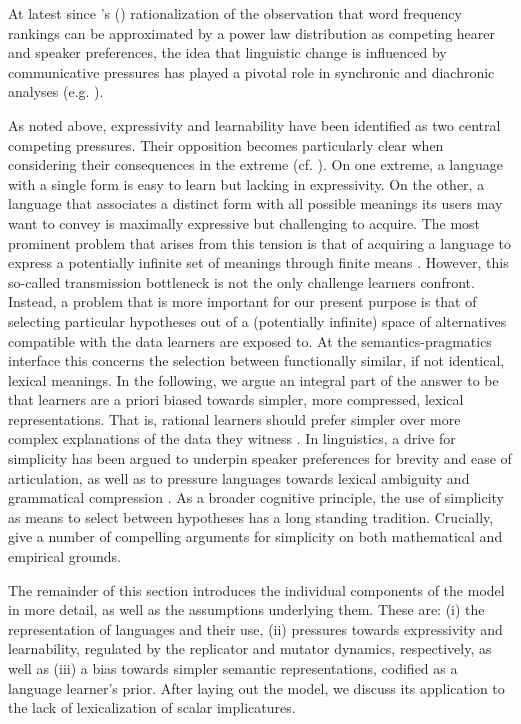 \documentclass[a4paper]{article}
\newcommand{\citeposs}[2][]{\citeauthor{#2}'s (\citeyear[#1]{#2})}
\newcommand{\hl}[1]{\textcolor[rgb]{.8,.33,.0}{#1}}%
\begin{document}
At latest since \citeposs{zipf:1949} rationalization of the observation that word frequency rankings can be approximated by a power law distribution as competing hearer and speaker preferences, the idea that linguistic change is influenced by communicative pressures has played a pivotal role in synchronic and diachronic analyses (e.g. \citealt{martinet:1962, horn:1984,jaeger+vRooij:2007,jaeger:2007, piantadosi:2014,kirby+etal:2015}). 

As noted above, expressivity and learnability have been identified as two central competing pressures. Their opposition becomes particularly clear when considering their consequences in the extreme (cf. \citealt{kemp+regier:2012,kirby+etal:2015}). On one extreme, a language with a single form is easy to learn but lacking in expressivity. On the other, a language that associates a distinct form with all possible meanings its users may want to convey is maximally expressive but challenging to acquire. The most prominent problem that arises from this tension is that of acquiring a language to express a potentially infinite set of meanings through finite means \citep{kirby:2002}. However, this so-called transmission bottleneck is not the only challenge learners confront. Instead, a problem that is more important for our present purpose is that of selecting particular hypotheses out of a (potentially infinite) space of alternatives compatible with the data learners are exposed to. At the semantics-pragmatics interface this concerns the selection between functionally similar, if not identical, lexical meanings.  In the following, we argue an integral part of the answer to be that learners are a priori biased towards simpler, more compressed, lexical representations. That is, rational learners should prefer simpler over more complex explanations of the data they witness \citep{feldman:2000, chater+vitanyi:2003, piantadosi+etal:2012a, kirby+etal:2015,piantadosi+etal:underreview}. In linguistics, a drive for simplicity has been argued to underpin speaker preferences for brevity and ease of articulation, as well as to pressure languages towards lexical ambiguity and grammatical compression \citep{zipf:1949,grice:1975,piantadosi+etal:2012, kirby+etal:2015}. \hl{As a broader cognitive principle, the use of simplicity as means to select between hypotheses has a long standing tradition. Crucially, \citet{chater+vitanyi:2003} give a number of compelling arguments for simplicity on both mathematical and empirical grounds.}


The remainder of this section introduces the individual components of the model in more detail, as well as the assumptions underlying them. These are: (i) the representation of languages and their use, (ii) pressures towards expressivity and learnability, regulated by the replicator and mutator dynamics, respectively, as well as (iii) a bias towards simpler semantic representations, codified as a language learner's prior. After laying out the model, we discuss its application to the lack of lexicalization of scalar implicatures.
\end{document}
